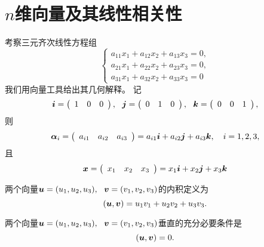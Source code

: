 \section{$n$维向量及其线性相关性}

\begin{frame}
考察三元齐次线性方程组
\begin{equation}\label{ls}
  \left\{
  \begin{array}{l}
    a_{11}x_1+a_{12}x_2+a_{13}x_3=0,\\[0.1in]
    a_{21}x_1+a_{22}x_2+a_{23}x_3=0,\\[0.1in]
    a_{31}x_1+a_{32}x_2+a_{33}x_3=0
  \end{array}
  \right.
\end{equation}
我们用向量工具给出其几何解释。 记
$$
{\boldsymbol{i}} = \left(
\begin{array}{ccc}
  1&
  0&
  0
\end{array}
\right), ~~
{\boldsymbol{j}} = \left(
\begin{array}{ccc}
  0&
  1&
  0
\end{array}
\right), ~~
{\boldsymbol{k}} = \left(
\begin{array}{ccc}
  0&
  0&
  1
\end{array}
\right),
$$
则
$$
\boldsymbol{\alpha}_i = \left(
\begin{array}{ccc}
  a_{i1}&
  a_{i2}&
  a_{i3}
\end{array}
\right) = a_{i1} {\boldsymbol{i}} + a_{i2} {\boldsymbol{j}} + a_{i3} {\boldsymbol{k}}, \quad i=1,2,3,
$$
且
$$
{\boldsymbol{x}} = \left(
\begin{array}{ccc}
  x_1&
  x_2&
  x_3
\end{array}
\right) = x_1{\boldsymbol{i}} + x_2{\boldsymbol{j}} + x_3{\boldsymbol{k}}
$$
\end{frame}

\begin{frame}
\begin{dingyi}[向量的内积]
  两个向量${\boldsymbol{u}}=(u_1,u_2,u_3), ~~{\boldsymbol{v}}=(v_1,v_2,v_3)$的内积定义为
  $$
  ({\boldsymbol{u}},{\boldsymbol{v}})=u_1v_1+u_2v_2+u_3v_3.
  $$
\end{dingyi}

\begin{dingyi}[向量的垂直]
  两个向量${\boldsymbol{u}}=(u_1,u_2,u_3), ~~{\boldsymbol{v}}=(v_1,v_2,v_3)$垂直的充分必要条件是
  $$
  ({\boldsymbol{u}},{\boldsymbol{v}})=0.
  $$
\end{dingyi}
\end{frame}

